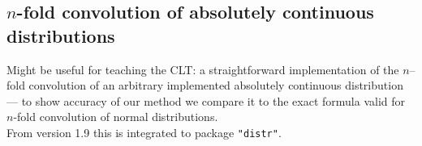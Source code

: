 \documentclass[11pt]{article}
\newcommand{\pkg}[1]{{\tt "#1"}}
\begin{document}
\subsection{$n$-fold convolution of absolutely continuous distributions}\label{exe10}
\begin{small}
Might be useful for teaching the CLT: a straightforward implementation of the 
$n$--fold convolution of an
arbitrary implemented absolutely continuous distribution --- to show accuracy 
of our method we compare it to the
exact formula valid for $n$-fold convolution of normal distributions.\\
From version 1.9 this is integrated to package \pkg{distr}.
\end{small}
\end{document}
